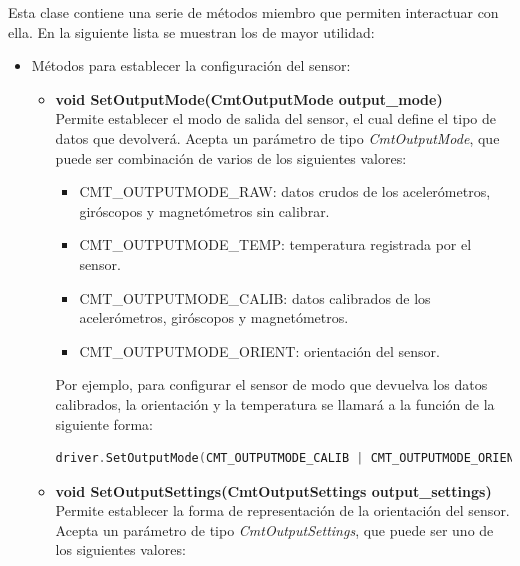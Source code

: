 \documentclass[12pt, a4paper]{report}
\begin{document}
Esta clase contiene una serie de métodos miembro que permiten interactuar con ella. En la siguiente lista se muestran los de mayor utilidad:

\begin{itemize}

	\item Métodos para establecer la configuración del sensor:

	\begin{itemize}
	
		\item \textbf{void SetOutputMode(CmtOutputMode output\_mode)}\\
		Permite establecer el modo de salida del sensor, el cual define el tipo de datos que devolverá. Acepta un parámetro de tipo \textit{CmtOutputMode}, que puede ser combinación de varios de los siguientes valores:
		
		\begin{itemize}
		
			\item CMT\_OUTPUTMODE\_RAW: datos crudos de los acelerómetros, giróscopos y magnetómetros sin calibrar.
			\item CMT\_OUTPUTMODE\_TEMP: temperatura registrada por el sensor.
			\item CMT\_OUTPUTMODE\_CALIB: datos calibrados de los acelerómetros, giróscopos y magnetómetros.
			\item CMT\_OUTPUTMODE\_ORIENT: orientación del sensor.
		
		\end{itemize}
		
		Por ejemplo, para configurar el sensor de modo que devuelva los datos calibrados, la orientación y la temperatura se llamará a la función de la siguiente forma:
		
		\begin{lstlisting}[language=C++]
driver.SetOutputMode(CMT_OUTPUTMODE_CALIB | CMT_OUTPUTMODE_ORIENT | CMT_OUTPUTMODE_TEMP);
		\end{lstlisting}
		
		\item \textbf{void SetOutputSettings(CmtOutputSettings output\_settings)}\\
		Permite establecer la forma de representación de la orientación del sensor. Acepta un parámetro de tipo \textit{CmtOutputSettings}, que puede ser uno de los siguientes valores:
		
		\begin{itemize}
		

\end{itemize}
\end{itemize}
\end{itemize}
\end{document}
